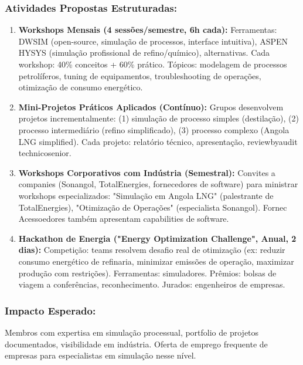 \documentclass[12pt,a4paper]{article}
\begin{document}
\subsubsection*{Atividades Propostas Estruturadas:}

\begin{enumerate}[itemsep=0.25cm]
    \item \textbf{Workshops Mensais (4 sessões/semestre, 6h cada):} Ferramentas: DWSIM (open-source, simulação de processos, interface intuitiva), ASPEN HYSYS (simulação profissional de refino/químico), alternativas. Cada workshop: 40\% conceitos + 60\% prático. Tópicos: modelagem de processos petrolíferos, tuning de equipamentos, troubleshooting de operações, otimização de consumo energético.
    
    \item \textbf{Mini-Projetos Práticos Aplicados (Contínuo):} Grupos desenvolvem projetos incrementalmente: (1) simulação de processo simples (destilação), (2) processo intermediário (refino simplificado), (3) processo complexo (Angola LNG simplified). Cada projeto: relatório técnico, apresentação, reviewbyaudit technicosenior.
    
    \item \textbf{Workshops Corporativos com Indústria (Semestral):} Convites a companies (Sonangol, TotalEnergies, fornecedores de software) para ministrar workshops especializados: "Simulação em Angola LNG" (palestrante de TotalEnergies), "Otimização de Operações" (especialista Sonangol). Fornec Acessoedores também apresentam capabilities de software.
    
    \item \textbf{Hackathon de Energia ("Energy Optimization Challenge", Anual, 2 dias):} Competição: teams resolvem desafio real de otimização (ex: reduzir consumo energético de refinaria, minimizar emissões de operação, maximizar produção com restrições). Ferramentas: simuladores. Prêmios: bolsas de viagem a conferências, reconhecimento. Jurados: engenheiros de empresas.
\end{enumerate}

\subsubsection*{Impacto Esperado:}
Membros com expertisa em simulação processual, portfolio de projetos documentados, visibilidade em indústria. Oferta de emprego frequente de empresas para especialistas em simulação nesse nível.
\end{document}
